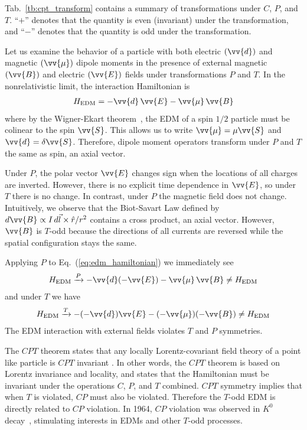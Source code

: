 Tab.~\ref{tb:cpt_transform} contains a summary of transformations under $C$, $P$, and $T$. ``$+$'' denotes that the quantity is even (invariant) under the transformation, and ``$-$'' denotes that the quantity is odd under the transformation.

Let us examine the behavior of a particle with both electric $(\vv{d})$ and magnetic $(\vv{\mu})$ dipole moments in the presence of external magnetic $(\vv{B})$ and electric $(\vv{E})$ fields under transformations $P$ and $T$. In the nonrelativistic limit, the interaction Hamiltonian is 
%
\begin{gather}
    H_\text{EDM} = -\vv{d}\,\vv{E}-\vv{\mu}\,\vv{B} \label{eq:edm_hamiltonian}
\end{gather}
%
where by the Wigner-Ekart theorem~\cite{sakurai_quantum}, the EDM of a spin $1/2$ particle must be colinear to the spin $\vv{S}$. This allows us to write $\vv{\mu}=\mu\vv{S}$ and $\vv{d}=\delta\vv{S}$. Therefore, dipole moment operators transform under $P$ and $T$ the same as spin, an axial vector.

Under $P$, the polar vector $\vv{E}$ changes sign when the locations of all charges are inverted. However, there is no explicit time dependence in $\vv{E}$, so under $T$ there is no change. In contrast, under $P$ the magnetic field does not change. Intuitively, we observe that the Biot-Savart Law defined by $d\vv{B}\propto I\,d\vec{l} \times \hat{r} /r^2$ contains a cross product, an axial vector. However, $\vv{B}$ is $T$-odd because the directions of all currents are reversed while the spatial configuration stays the same. 

Applying $P$ to Eq.~(\ref{eq:edm_hamiltonian}) we immediately see
%
\begin{gather}
    H_\text{EDM}\xrightarrow{P} -\vv{d}(-\vv{E}) - \vv{\mu}\,\vv{B} \neq H_\text{EDM}
\end{gather}
%
and under $T$ we have
%
\begin{gather}
    H_\text{EDM}\xrightarrow{T} -(-\vv{d})\vv{E} - (-\vv{\mu})(-\vv{B}) \neq H_\text{EDM}
\end{gather}
%
The EDM interaction with external fields violates $T$ and $P$ symmetries. 

The $CPT$ theorem states that any locally Lorentz-covariant field theory of a point like particle is $CPT$ invariant \cite{LUDERS19571, schmidt-wellenburg_quest_2017, cp_violation_wo_strangeness}. In other words, the $CPT$ theorem is based on Lorentz invariance and locality, and states that the Hamiltonian must be invariant under the operations $C$, $P$, and $T$ combined. $CPT$ symmetry implies that when $T$ is violated, $CP$ must also be violated. Therefore the $T$-odd EDM is directly related to $CP$ violation. In 1964, $CP$ violation was observed in $K^0$ decay~\cite{christenson_1964}, stimulating interests in EDMs and other $T$-odd processes.

